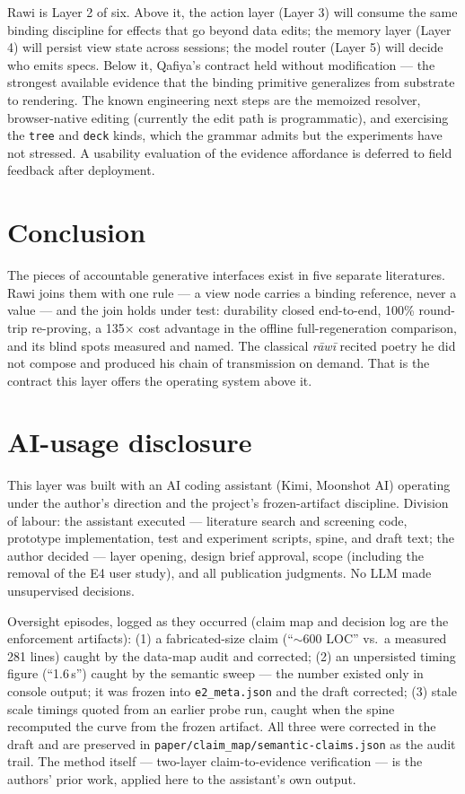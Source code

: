 \documentclass[11pt]{article}
\begin{document}
Rawi is Layer 2 of six. Above it, the action layer (Layer 3) will consume the same
binding discipline for effects that go beyond data edits; the memory layer (Layer 4) will
persist view state across sessions; the model router (Layer 5) will decide who emits
specs. Below it, Qafiya's contract held without modification --- the strongest available
evidence that the binding primitive generalizes from substrate to rendering. The known
engineering next steps are the memoized resolver, browser-native editing (currently the
edit path is programmatic), and exercising the \texttt{tree} and \texttt{deck} kinds,
which the grammar admits but the experiments have not stressed. A usability evaluation of
the evidence affordance is deferred to field feedback after deployment.

\section{Conclusion}

The pieces of accountable generative interfaces exist in five separate literatures. Rawi
joins them with one rule --- a view node carries a binding reference, never a value ---
and the join holds under test: durability closed end-to-end, 100\% round-trip re-proving,
a 135$\times$ cost advantage in the offline full-regeneration comparison, and its blind
spots measured and named. The classical
\emph{r\=aw\=i} recited poetry he did not compose and produced his chain of transmission
on demand. That is the contract this layer offers the operating system above it.

\section*{AI-usage disclosure}

This layer was built with an AI coding assistant (Kimi, Moonshot AI) operating under the
author's direction and the project's frozen-artifact discipline. Division of labour: the
assistant executed --- literature search and screening code, prototype implementation,
test and experiment scripts, spine, and draft text; the author decided --- layer opening,
design brief approval, scope (including the removal of the E4 user study), and all
publication judgments. No LLM made unsupervised decisions.

Oversight episodes, logged as they occurred (claim map and decision log are the
enforcement artifacts): (1) a fabricated-size claim (``$\sim$600 LOC'' vs.\ a measured
281 lines) caught by the data-map audit and corrected; (2) an unpersisted timing figure
(``1.6\,s'') caught by the semantic sweep --- the number existed only in console output;
it was frozen into \texttt{e2\_meta.json} and the draft corrected; (3) stale scale
timings quoted from an earlier probe run, caught when the spine recomputed the curve from
the frozen artifact. All three were corrected in the draft and are preserved in
\texttt{paper/claim\_map/semantic-claims.json} as the audit trail. The method itself ---
two-layer claim-to-evidence verification --- is the authors' prior work, applied here to
the assistant's own output.
\end{document}
